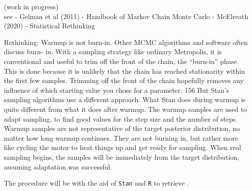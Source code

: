 {\color{red} (work in progress) \\
see 
- Gelman et al (2011) - Handbook of Markov Chain Monte Carlo
- McElreath (2020) - Statistical Rethinking

Rethinking: Warmup is not burn-in. Other MCMC algorithms and software often discuss burn-
in. With a sampling strategy like ordinary Metropolis, it is conventional and useful to trim off the
front of the chain, the “burn-in” phase. This is done because it is unlikely that the chain has reached
stationarity within the first few samples. Trimming off the front of the chain hopefully removes any
influence of which starting value you chose for a parameter. 156
But Stan’s sampling algorithms use a different approach. What Stan does during warmup is quite
different from what it does after warmup. The warmup samples are used to adapt sampling, to find
good values for the step size and the number of steps. Warmup samples are not representative of
the target posterior distribution, no matter how long warmup continues. They are not burning in,
but rather more like cycling the motor to heat things up and get ready for sampling. When real
sampling begins, the samples will be immediately from the target distribution, assuming adaptation
was successful.

}


The procedure will be with the aid of \texttt{Stan} \cite{Stan2020} and \texttt{R} \cite{R2015, RStan2020} to retrieve . \\





